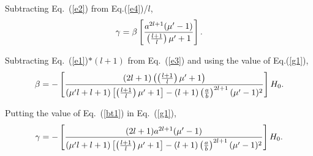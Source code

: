 Subtracting Eq.~(\ref{e2}) from Eq.(\ref{e4})/$l$,
\begin{equation}\label{g1}
\gamma=\beta \left[\frac{a^{2l+1}(\mu'-1)}{\left(\frac{l+1}{l}\right)\mu'+1}\right]{\rm .}
\end{equation}

Subtracting Eq.~(\ref{e1})$*(l+1)$ from Eq.~(\ref{e3}) and using the value of Eq.(\ref{g1}),
\begin{equation}\label{bt1}
\beta=-\left[\frac{(2l+1)\left(\left(\frac{l+1}{l}\right)\mu'+1\right)}{(\mu'l+l+1)\left[\left(\frac{l+1}{l}\right)\mu'+1\right]-(l+1)\left(\frac{a}{b}\right)^{2l+1}(\mu'-1)^2}\right]H_0{\rm .}
\end{equation}



Putting the value of Eq.~(\ref{bt1}) in Eq.~(\ref{g1}),
\begin{equation}\label{g2}
\gamma=-\left[\frac{(2l+1)a^{2l+1}(\mu'-1)}{(\mu'l+l+1)\left[\left(\frac{l+1}{l}\right)\mu'+1\right]-(l+1)\left(\frac{a}{b}\right)^{2l+1}(\mu'-1)^2}\right] H_0{\rm .}    
\end{equation}


